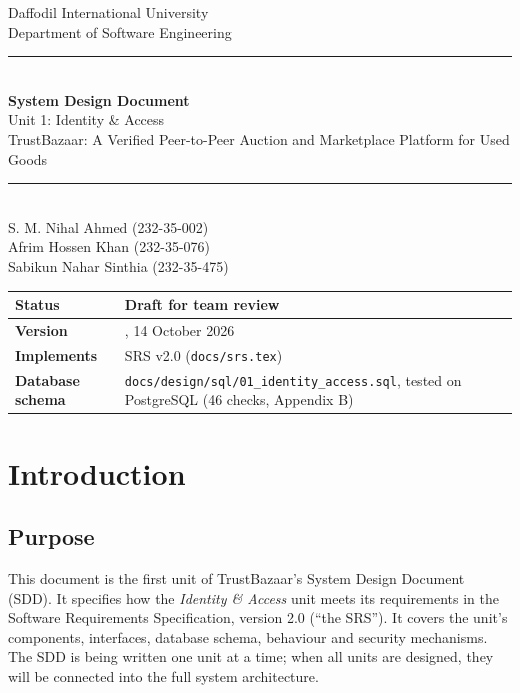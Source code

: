 \documentclass[11pt,a4paper]{article}
\begin{document}
\begin{titlepage}
\centering
\vspace*{1cm}
{\Large Daffodil International University}\\[0.2cm]
{\large Department of Software Engineering}\\[2cm]
\rule{\linewidth}{0.5pt}\\[0.4cm]
{\huge\bfseries System Design Document}\\[0.3cm]
{\LARGE Unit 1: Identity \& Access}\\[0.3cm]
{\large TrustBazaar: A Verified Peer-to-Peer Auction and Marketplace Platform for Used Goods}\\[0.2cm]
\rule{\linewidth}{0.5pt}\\[1.6cm]
{\large S. M. Nihal Ahmed (232-35-002)\\[0.1cm] Afrim Hossen Khan (232-35-076)\\[0.1cm] Sabikun Nahar Sinthia (232-35-475)}\\[1.6cm]
\begin{tabular}{|l|>{\raggedright\arraybackslash}p{8cm}|}
\hline
\textbf{Status} & Draft for team review \\ \hline
\textbf{Version} & 0.1, 14 October 2026 \\ \hline
\textbf{Implements} & SRS v2.0 (\texttt{docs/srs.tex}) \\ \hline
\textbf{Database schema} & \texttt{docs/design/sql/01\_identity\_access.sql}, tested on PostgreSQL (46 checks, Appendix B) \\ \hline
\end{tabular}
\vfill
\end{titlepage}
\tableofcontents
\newpage
\section{Introduction}

\subsection{Purpose}
This document is the first unit of TrustBazaar's System Design Document (SDD). It specifies how the \emph{Identity \& Access} unit meets its requirements in the Software Requirements Specification, version 2.0 (``the SRS''). It covers the unit's components, interfaces, database schema, behaviour and security mechanisms. The SDD is being written one unit at a time; when all units are designed, they will be connected into the full system architecture.
\end{document}
